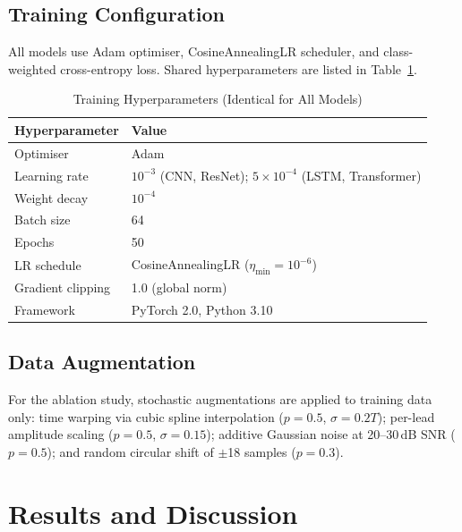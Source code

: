 \documentclass[conference]{IEEEtran}
\begin{document}
\subsection{Training Configuration}

All models use Adam optimiser, CosineAnnealingLR scheduler, and class-weighted cross-entropy loss. Shared hyperparameters are listed in Table~\ref{tab:hyperparams}.

\begin{table}[htbp]
\caption{Training Hyperparameters (Identical for All Models)}
\begin{center}
\begin{tabular}{|l|l|}
\hline
\textbf{Hyperparameter} & \textbf{Value} \\
\hline
Optimiser         & Adam \\
\hline
Learning rate     & $10^{-3}$ (CNN, ResNet); $5{\times}10^{-4}$ (LSTM, Transformer) \\
\hline
Weight decay      & $10^{-4}$ \\
\hline
Batch size        & 64 \\
\hline
Epochs            & 50 \\
\hline
LR schedule       & CosineAnnealingLR ($\eta_\text{min} = 10^{-6}$) \\
\hline
Gradient clipping & 1.0 (global norm) \\
\hline
Framework         & PyTorch 2.0, Python 3.10 \\
\hline
\end{tabular}
\label{tab:hyperparams}
\end{center}
\end{table}

\subsection{Data Augmentation}

For the ablation study, stochastic augmentations are applied to training data only: time warping via cubic spline interpolation ($p{=}0.5$, $\sigma{=}0.2T$); per-lead amplitude scaling ($p{=}0.5$, $\sigma{=}0.15$); additive Gaussian noise at 20--30\,dB SNR ($p{=}0.5$); and random circular shift of $\pm$18 samples ($p{=}0.3$).

\section{Results and Discussion}
\end{document}
